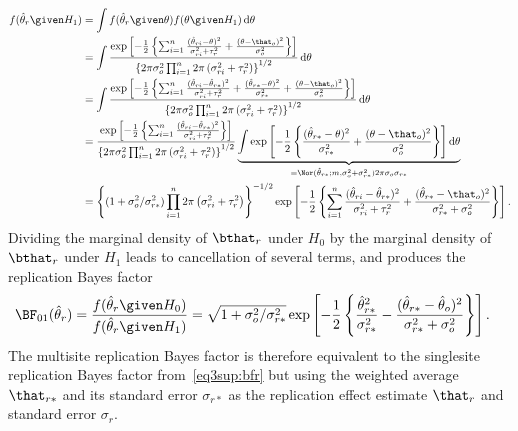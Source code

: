 \begin{subappendices}
\begin{align*}
        f(\hat{\theta}_{r} \given H_{1})
        &= \int f(\hat{\theta}_{r} \given \theta) f(\theta \given H_{1})
                        \, \text{d}\theta \\
              &= \int \frac{\exp\left[-\frac{1}{2} \left\{\sum_{i=1}^{n} \frac{(\hat{\theta}_{ri} - \theta)^{2}}{\sigma^{2}_{ri} + \tau^{2}_{r}} +
                  \frac{(\theta - \that_{o})^{2}}{\sigma^{2}_{o}}\right\} \right]}{
                                    \left\{2\pi \sigma^{2}_{o} \prod_{i = 1}^{n} 2\pi \left(\sigma^{2}_{ri} + \tau^{2}_{r}\right)\right\}^{1/2}}
    \, \text{d}\theta \\
  &= \int \frac{
    \exp\left[-\frac{1}{2} \left\{\sum_{i=1}^{n} \frac{(\hat{\theta}_{ri} - \hat{\theta}_{r*})^{2}}{\sigma^{2}_{ri} + \tau^{2}_{r}} +  \frac{(\hat{\theta}_{r*} - \theta)^{2}}{\sigma^{2}_{r*}} +
    \frac{(\theta - \that_{o})^{2}}{\sigma^{2}_{o}}\right\} \right]}{
    \left\{2\pi \sigma^{2}_{o} \prod_{i = 1}^{n} 2\pi \left(\sigma^{2}_{ri} + \tau^{2}_{r}\right)\right\}^{1/2}}
    \, \text{d}\theta \\
  &= \frac{\exp\left[-\frac{1}{2} \left\{\sum_{i=1}^{n} \frac{(\hat{\theta}_{ri} - \hat{\theta}_{r*})^{2}}{\sigma^{2}_{ri} + \tau^{2}_{r}}\right\} \right]}{\left\{2\pi \sigma^{2}_{o} \prod_{i = 1}^{n} 2\pi \left(\sigma^{2}_{ri} + \tau^{2}_{r}\right)\right\}^{1/2}}
    \underbrace{\int \exp\left[-\frac{1}{2} \left\{\frac{(\hat{\theta}_{r*} - \theta)^{2}}{\sigma^{2}_{r*}} +
    \frac{(\theta - \that_{o})^{2}}{\sigma^{2}_{o}}\right\} \right] \text{d}\theta}_{= \Nor(\hat{\theta}_{r*}; m, \sigma^{2}_{o} + \sigma^{2}_{r*}) 2\pi \sigma_{o} \sigma_{r*}} \\
  &= \left\{(1 + \sigma^{2}_{o}/\sigma^{2}_{r*}) \prod_{i = 1}^{n} 2\pi \left(\sigma^{2}_{ri} + \tau^{2}_{r}\right)\right\}^{-1/2} \exp\left[-\frac{1}{2}\left\{
    \sum_{i=1}^{n} \frac{(\hat{\theta}_{ri} - \hat{\theta}_{r*})^{2}}{\sigma^{2}_{ri} + \tau^{2}_{r}} + \frac{(\hat{\theta}_{r*} - \that_{o})^{2}}{\sigma^{2}_{r*} + \sigma^{2}_{o}}\right\}\right].
\end{align*}
Dividing the marginal density of $\bthat_{r}$ under $H_{0}$ by the marginal
density of $\bthat_{r}$ under $H_{1}$ leads to cancellation of several terms, and
produces the replication Bayes factor
\begin{align*}
  \BF_{01}(\hat{\theta}_{r})
  &= \frac{f(\hat{\theta}_{r} \given H_{0})}{f(\hat{\theta}_{r} \given H_{1})}
    = \sqrt{1 + \sigma^{2}_{o}/\sigma^{2}_{r*}}  \exp\left[-\frac{1}{2}\left\{
    \frac{\hat{\theta}_{r*}^{2}}{\sigma^{2}_{r*}} -
    \frac{(\hat{\theta}_{r*} - \hat{\theta}_{o})^{2}}{\sigma^{2}_{r*} + \sigma^{2}_{o}}\right\}\right].
\end{align*}
The multisite replication Bayes factor is therefore equivalent to the singlesite
replication Bayes factor from~\eqref{eq3sup:bfr} but using the weighted average
$\that_{r*}$ and its standard error $\sigma_{r*}$ as the replication effect
estimate $\that_{r}$ and standard error $\sigma_{r}$.


\end{subappendices}
